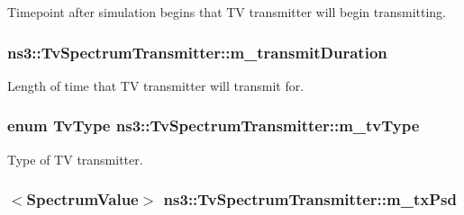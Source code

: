 Timepoint after simulation begins that TV transmitter will begin transmitting. 

\subsubsection[{\texorpdfstring{m\+\_\+transmit\+Duration}{m_transmitDuration}}]{ ns3\+::\+Tv\+Spectrum\+Transmitter\+::m\+\_\+transmit\+Duration\hspace{0.3cm}{\ttfamily [private]}}\hypertarget{classns3_1_1TvSpectrumTransmitter_a3194786c04a42f635dde6f56b317f75b}{}\label{classns3_1_1TvSpectrumTransmitter_a3194786c04a42f635dde6f56b317f75b}


Length of time that TV transmitter will transmit for. 

\subsubsection[{\texorpdfstring{m\+\_\+tv\+Type}{m_tvType}}]{\setlength{\rightskip}{0pt plus 5cm}enum {\bf Tv\+Type} ns3\+::\+Tv\+Spectrum\+Transmitter\+::m\+\_\+tv\+Type\hspace{0.3cm}{\ttfamily [private]}}\hypertarget{classns3_1_1TvSpectrumTransmitter_a78373632fd774cf3c26675dc0379ca13}{}\label{classns3_1_1TvSpectrumTransmitter_a78373632fd774cf3c26675dc0379ca13}


Type of TV transmitter. 

\subsubsection[{\texorpdfstring{m\+\_\+tx\+Psd}{m_txPsd}}]{$<${\bf Spectrum\+Value}$>$ ns3\+::\+Tv\+Spectrum\+Transmitter\+::m\+\_\+tx\+Psd\hspace{0.3cm}{\ttfamily [private]}}\hypertarget{classns3_1_1TvSpectrumTransmitter_add26555fe4d51eb5d9a757a54dc36dd0}{}\label{classns3_1_1TvSpectrumTransmitter_add26555fe4d51eb5d9a757a54dc36dd0}


